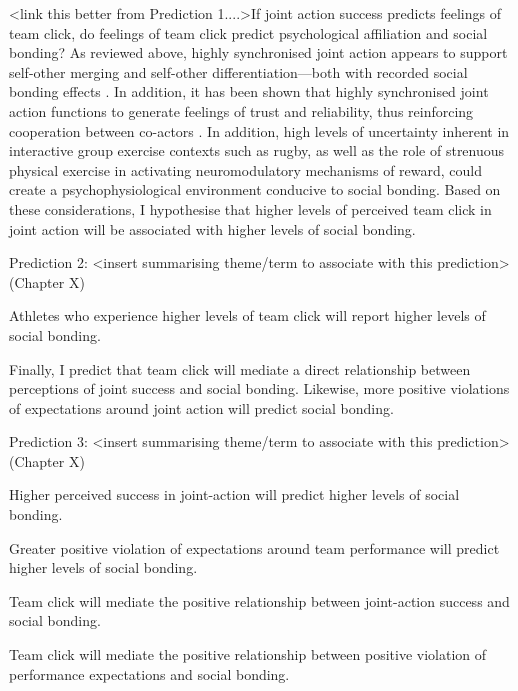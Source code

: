 \begin{CJK}{UTF8}{gbsn}
{  \bigskip

   <link this better from Prediction 1....>If joint action success predicts feelings of team click, do feelings of team click predict psychological affiliation and social bonding? As reviewed above, highly synchronised joint action appears to support self-other merging and self-other differentiation---both with recorded social bonding effects \citep{Mogan2017,Milward2016}. In addition, it has been shown that highly synchronised joint action functions to generate feelings of trust and reliability, thus reinforcing cooperation between co-actors \citep{Reddish2013a}. In addition, high levels of uncertainty inherent in interactive group exercise contexts such as rugby, as well as the role of strenuous physical exercise in activating neuromodulatory mechanisms of reward, could create a psychophysiological environment conducive to social bonding.  Based on these considerations, I hypothesise that higher levels of perceived team click in joint action will be associated with higher levels of social bonding.
  \bigskip
  \begin{indent}
  \begin{description}
Prediction 2: <insert summarising theme/term to associate with this prediction> (Chapter X)
    \item [Prediction 2.a] Athletes who experience higher levels of team click will report higher levels of social bonding.
  \end{description}
  \end{indent}

  Finally, I predict that team click will mediate a direct relationship between perceptions of joint success and social bonding.  Likewise, more positive violations of expectations around joint action will predict social bonding.
  \bigskip
  \begin{indent}
  \begin{description}
Prediction 3: <insert summarising theme/term to associate with this prediction> (Chapter X)
    \item [Prediction 3.a] Higher perceived success in joint-action will predict higher levels of social bonding.
   \item [Prediction 3.b] Greater positive violation of expectations around team performance will predict higher levels of social bonding.
    \item [Prediction 4.a] Team click will mediate the positive relationship between joint-action success and social bonding.
    \item [Prediction 4.b] Team click will mediate the positive relationship between positive violation of performance expectations and social bonding.


\end{description}
\end{indent}}
\end{CJK}
